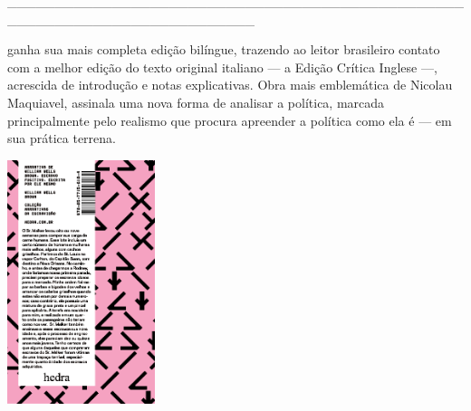 \hspace*{-2cm}\_\_\_\_\_\_\_\_\_\_\_\_\_\_\_\_\_\_\_\_\_\_\_\_\_\_\_\_\_\_\_\_\_\_\_\_\_\_\_\_\_\_\_\_\_\_\_\_\_\_\_\_\_\_\_\_\_\_\_\_\_\_\_\_\_\_\_\_\_\_\_\_\_\_

\medskip

 ganha sua mais completa edição bilíngue, trazendo ao leitor brasileiro contato com a melhor edição do texto original italiano --- a Edição Crítica Inglese ---, acrescida de introdução e notas explicativas. Obra mais emblemática de Nicolau Maquiavel, {} assinala uma nova forma de analisar a política, marcada principalmente pelo realismo que procura apreender a política como ela é --- em sua prática terrena.

\hspace{.5cm}

\hspace*{-.4cm}\begin{minipage}[c]{0.90\linewidth}
\small{
{}}
\end{minipage}

\pagebreak

\hspace{.5cm}

\begin{center}
\hspace*{-.5cm}\includegraphics[width=43mm]{./imgs/wwb.png}
\end{center}

